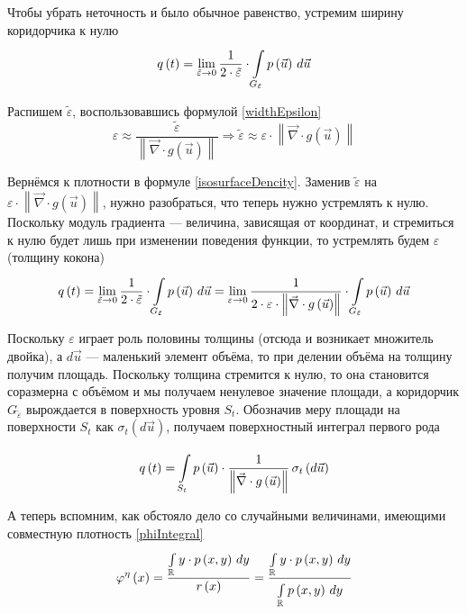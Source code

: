 Чтобы убрать неточность и было обычное равенство,
устремим ширину коридорчика к нулю
\begin{equation}\label{isosurfaceDencity}
  q\left( t \right)
      = \lim_{\tilde{\varepsilon} \to 0} \frac{1}{2 \cdot \tilde{\varepsilon}}
      \cdot \integrall{G_{\tilde{\varepsilon}}}{d\vec{u}}{\pdf{\vec{u}}}
\end{equation}

Распишем $\tilde{\varepsilon}$, воспользовавшись формулой \eqref{widthEpsilon}
$$\varepsilon
  \approx \frac{\tilde{\varepsilon}}
      {\left\| \vec{\nabla} \cdot {g\left( \vec{u} \right)} \right\|}
  \Rightarrow
      \tilde{\varepsilon} \approx \varepsilon
      \cdot \left\| \vec{\nabla} \cdot g\left( \vec{u} \right) \right\|$$

Вернёмся к плотности в формуле \eqref{isosurfaceDencity}.
Заменив $\tilde{\varepsilon}$ на $\varepsilon
\cdot \left\| \vec{\nabla} \cdot g\left( \vec{u} \right) \right\|$,
нужно разобраться, что теперь нужно устремлять к нулю.
Поскольку модуль градиента --- величина, зависящая от координат,
и стремиться к нулю будет лишь при изменении поведения функции,
то устремлять будем $\varepsilon$ (толщину кокона)
$$q\left( t \right)
      = \lim_{\tilde{\varepsilon} \to 0} \frac{1}{2 \cdot \tilde{\varepsilon}}
      \cdot \integrall{G_{\tilde{\varepsilon}}}{d\vec{u}}{\pdf{\vec{u}}}
      = \lim_{\varepsilon \to 0} \frac{1}{2 \cdot \varepsilon
      \cdot \left\| \vec{\nabla} \cdot g\left( \vec{u} \right) \right\|}
      \cdot \integrall{G_{\tilde{\varepsilon}}}{d\vec{u}}{\pdf{\vec{u}}}$$

Поскольку $\varepsilon$ играет роль половины толщины
(отсюда и возникает множитель двойка),
а $d\vec{u}$ --- маленький элемент объёма,
то при делении объёма на толщину получим площадь.
Поскольку толщина стремится к нулю,
то она становится соразмерна с объёмом и мы получаем ненулевое значение площади,
а коридорчик $G_{\tilde{\varepsilon}}$ вырождается в поверхность уровня $S_t$.
Обозначив меру площади на поверхности $S_t$ как
$\sigma_{t}\left( d\vec{u} \right)$,
получаем поверхностный интеграл первого рода

\begin{equation}\label{formula:conditionDencity}
  q\left( t \right)
  = \integrall{S_t}{\sigma_{t}\left(d\vec{u} \right)}{
      \pdf{\vec{u}} \cdot \frac{1}
      {\left\| \vec{\nabla} \cdot g\left( \vec{u} \right) \right\|}}
\end{equation}

А теперь вспомним, как обстояло дело со случайными величинами,
имеющими совместную плотность \eqref{phiIntegral}
$$\varphi^{\eta}\left( x \right)
  = \frac{\integral{\mathbb{R}}{}{y}{y \cdot \pdf{x,y}}}
      {r\left( x \right)}
  = \frac{\integral{\mathbb{R}}{}{y}{y \cdot \pdf{x,y}}}
      {\integral{\mathbb{R}}{}{y}{\pdf{x,y}}}$$

